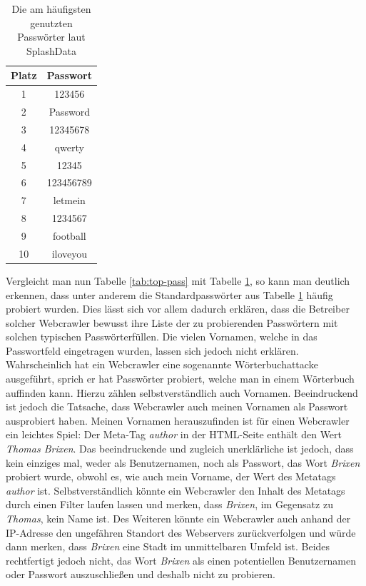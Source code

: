 \begin{table}[htb!]
	\centering
	\begin{tabular}{c|c}
		\textbf{Platz}&\textbf{Passwort}\\\hline
		1 & 123456\\
		2 & Password\\
		3 & 12345678\\
		4 & qwerty\\
		5 & 12345\\
		6 & 123456789\\
		7 & letmein\\
		8 & 1234567\\
		9 & football\\
		10 & iloveyou\\
	\end{tabular}
	\caption{Die am häufigsten genutzten Passwörter laut SplashData}
	\label{tab:top-pass-splash}
\end{table}
Vergleicht man nun Tabelle \ref{tab:top-pass} mit Tabelle \ref{tab:top-pass-splash}, so kann man deutlich erkennen, dass unter anderem die Standardpasswörter aus Tabelle \ref{tab:top-pass-splash} häufig probiert wurden. Dies lässt sich vor allem dadurch erklären, dass die Betreiber solcher Webcrawler bewusst ihre Liste der zu probierenden Passwörtern mit solchen \glqq typischen Passwörter\grqq\space füllen. Die vielen Vornamen, welche in das Passwortfeld eingetragen wurden, lassen sich jedoch nicht erklären. Wahrscheinlich hat ein Webcrawler eine sogenannte Wörterbuchattacke ausgeführt, sprich er hat Passwörter probiert, welche man in einem Wörterbuch auffinden kann. Hierzu zählen selbstverständlich auch Vornamen. Beeindruckend ist jedoch die Tatsache, dass Webcrawler auch meinen Vornamen als Passwort ausprobiert haben. Meinen Vornamen herauszufinden ist für einen Webcrawler ein leichtes Spiel: Der Meta-Tag \emph{author} in der HTML-Seite enthält den Wert \emph{Thomas Brixen}. Das beeindruckende und zugleich unerklärliche ist jedoch, dass kein einziges mal, weder als Benutzernamen, noch als Passwort, das Wort \emph{Brixen} probiert wurde, obwohl es, wie auch mein Vorname, der Wert des Metatags \emph{author} ist. Selbstverständlich könnte ein Webcrawler den Inhalt des Metatags durch einen Filter laufen lassen und merken, dass \emph{Brixen}, im Gegensatz zu \emph{Thomas}, kein Name ist. Des Weiteren könnte ein Webcrawler auch anhand der IP-Adresse den ungefähren Standort des Webservers zurückverfolgen und würde dann merken, dass \emph{Brixen} eine Stadt im unmittelbaren Umfeld ist. Beides rechtfertigt jedoch nicht, das Wort \emph{Brixen} als einen potentiellen Benutzernamen oder Passwort auszuschließen und deshalb nicht zu probieren.
